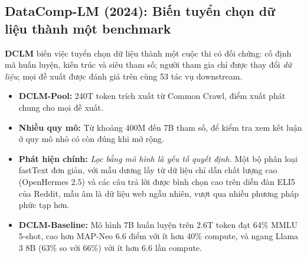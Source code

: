 \subsection{DataComp-LM (2024): Biến tuyển chọn dữ liệu thành một benchmark}
\label{ssec:dclm}
\textbf{DCLM} \cite{li2024dclm} biến việc tuyển chọn dữ liệu thành một cuộc thi có đối chứng: cố định mã huấn luyện, kiến trúc và siêu tham số; người tham gia chỉ được thay đổi \emph{dữ liệu}; mọi đề xuất được đánh giá trên cùng 53 tác vụ downstream.
\begin{itemize}
	\item \textbf{DCLM-Pool:} 240T token trích xuất từ Common Crawl, điểm xuất phát chung cho mọi đề xuất.
	\item \textbf{Nhiều quy mô:} Từ khoảng 400M đến 7B tham số, để kiểm tra xem kết luận ở quy mô nhỏ có còn đúng khi mở rộng.
	\item \textbf{Phát hiện chính:} \emph{Lọc bằng mô hình là yếu tố quyết định.} Một bộ phân loại fastText đơn giản, với mẫu dương lấy từ dữ liệu chỉ dẫn chất lượng cao (OpenHermes 2.5) và các câu trả lời được bình chọn cao trên diễn đàn ELI5 của Reddit, mẫu âm là dữ liệu web ngẫu nhiên, vượt qua nhiều phương pháp phức tạp hơn.
	\item \textbf{DCLM-Baseline:} Mô hình 7B huấn luyện trên 2.6T token đạt 64\% MMLU 5-shot, cao hơn MAP-Neo 6.6 điểm với ít hơn 40\% compute, và ngang Llama 3 8B (63\% so với 66\%) với ít hơn 6.6 lần compute.
\end{itemize}

